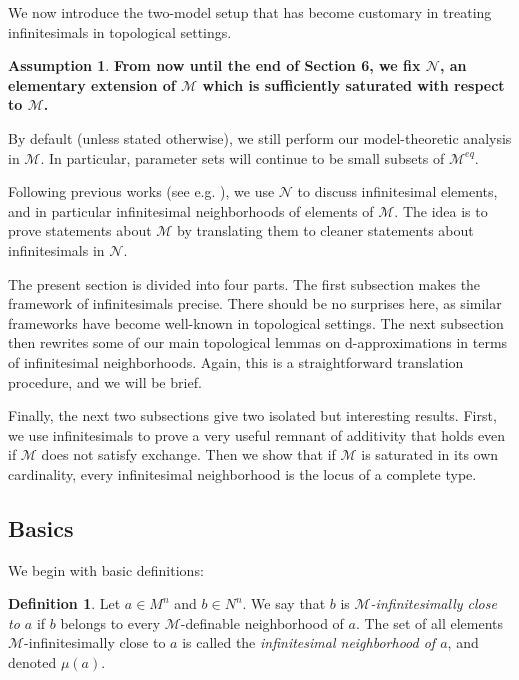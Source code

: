 \documentclass{amsart}
\theoremstyle{definition}
\newtheorem{definition}[theorem]{Definition}
\newtheorem{assumption}[theorem]{Assumption}
\begin{document}
We now introduce the two-model setup that has become customary in treating infinitesimals in topological settings.

\begin{assumption}
    \textbf{From now until the end of Section 6, we fix $\mathcal N$, an elementary extension of $\mathcal M$ which is sufficiently saturated with respect to $\mathcal M$.}
\end{assumption}

By default (unless stated otherwise), we still perform our model-theoretic analysis in $\mathcal M$. In particular, parameter sets will continue to be small subsets of $\mathcal M^{eq}$.

Following previous works (see e.g. \cite{PetGconf}), we use $\mathcal N$ to discuss infinitesimal elements, and in particular infinitesimal neighborhoods of elements of $\mathcal M$. The idea is to prove statements about $\mathcal M$ by translating them to cleaner statements about infinitesimals in $\mathcal N$.

The present section is divided into four parts. The first subsection makes the framework of infinitesimals precise. There should be no surprises here, as similar frameworks have become well-known in topological settings. The next subsection then rewrites some of our main topological lemmas on d-approximations in terms of infinitesimal neighborhoods. Again, this is a straightforward translation procedure, and we will be brief. 

Finally, the next two subsections give two isolated but interesting results. First, we use infinitesimals to prove a very useful remnant of additivity that holds even if $\mathcal M$ does not satisfy exchange. Then we show that if $\mathcal M$ is saturated in its own cardinality, every infinitesimal neighborhood is the locus of a complete type. 

\subsection{Basics}

We begin with basic definitions:

\begin{definition}\label{D: infinitesimal}
    Let $a\in M^n$ and $b\in N^n$. We say that $b$ is \textit{$\mathcal M$-infinitesimally close to $a$} if $b$ belongs to every $\mathcal M$-definable neighborhood of $a$. The set of all elements $\mathcal M$-infinitesimally close to $a$ is called the \textit{infinitesimal neighborhood of $a$}, and denoted $\mu(a)$.
\end{definition}
\end{document}
